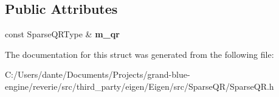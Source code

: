\subsection*{Public Attributes}
\begin{DoxyCompactItemize}
\item 
\mbox{\label{struct_eigen_1_1_sparse_q_r_matrix_q_return_type_adbaec94227345a75d1afd485237040f5}} 
const Sparse\+Q\+R\+Type \& {\bfseries m\+\_\+qr}
\end{DoxyCompactItemize}


The documentation for this struct was generated from the following file\+:\begin{DoxyCompactItemize}
\item 
C\+:/\+Users/dante/\+Documents/\+Projects/grand-\/blue-\/engine/reverie/src/third\+\_\+party/eigen/\+Eigen/src/\+Sparse\+Q\+R/Sparse\+Q\+R.\+h\end{DoxyCompactItemize}
